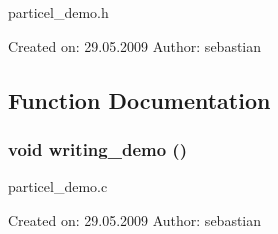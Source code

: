 particel\_\-demo.h 

Created on: 29.05.2009 Author: sebastian 

\subsection{Function Documentation}
\subsubsection{\setlength{\rightskip}{0pt plus 5cm}void writing\_\-demo ()}\label{writing__demo_8h_bdd925f1d9c8a09b9950c059c51e02d1}


particel\_\-demo.c 

Created on: 29.05.2009 Author: sebastian 
